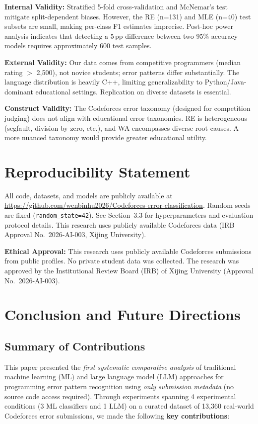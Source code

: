 \documentclass[10pt,a4paper]{article}
\begin{document}
\textbf{Internal Validity:} Stratified 5-fold cross-validation and McNemar's
test mitigate split-dependent biases. However, the RE (n=131) and MLE (n=40)
test subsets are small, making per-class F1 estimates imprecise. Post-hoc
power analysis indicates that detecting a 5\,pp difference between two 95\%
accuracy models requires approximately 600 test samples.

\textbf{External Validity:} Our data comes from competitive programmers
(median rating $>$ 2,500), not novice students; error patterns differ
substantially. The language distribution is heavily C++, limiting
generalizability to Python/Java-dominant educational settings. Replication on
diverse datasets is essential.

\textbf{Construct Validity:} The Codeforces error taxonomy (designed for
competition judging) does not align with educational error taxonomies. RE is
heterogeneous (segfault, division by zero, etc.), and WA encompasses diverse
root causes. A more nuanced taxonomy would provide greater educational
utility.

\section*{Reproducibility Statement}

\begin{sloppypar}\raggedright
All code, datasets, and models are publicly available at
\url{https://github.com/wenbinhu2026/Codeforces-error-classification}. Random
seeds are fixed (\texttt{random\_state=42}). See Section~3.3 for
hyperparameters and evaluation protocol details. This research uses publicly
available Codeforces data (IRB Approval No.~2026-AI-003, Xijing University).
\end{sloppypar}

\textbf{Ethical Approval:} This research uses publicly available Codeforces
submissions from public profiles. No private student data was collected.
The research was approved by the Institutional Review Board (IRB) of
Xijing University (Approval No.~2026-AI-003).

\section{Conclusion and Future Directions}

\subsection*{Summary of Contributions}
This paper presented the \textit{first systematic comparative analysis} of
traditional machine learning (ML) and large language model (LLM) approaches
for programming error pattern recognition using \textit{only submission
metadata} (no source code access required). Through experiments spanning 4
experimental conditions (3 ML classifiers and 1 LLM) on a curated dataset of
13,360 real-world Codeforces error submissions, we made the following
\textbf{key contributions}:
\end{document}
